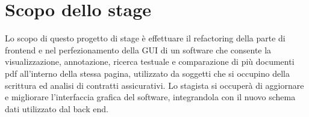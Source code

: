 \section*{Scopo dello stage}
Lo scopo di questo progetto di stage è effettuare il refactoring della parte di frontend e nel perfezionamento della GUI di un software che consente la visualizzazione, annotazione,
ricerca testuale e comparazione di più documenti pdf all’interno della stessa pagina, utilizzato da soggetti che si occupino della scrittura ed analisi di contratti assicurativi.
Lo stagista si occuperà di aggiornare e migliorare l'interfaccia grafica del software, integrandola con il nuovo schema dati utilizzato dal back end.

